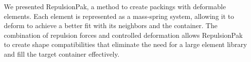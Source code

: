 
We presented RepulsionPak, a method to create packings with deformable elements.
Each element is represented as a
mass-spring system, allowing it to deform to achieve a better fit with
its neighbors and the container.
The combination of repulsion forces and controlled deformation
allows RepulsionPak to create shape compatibilities that
eliminate the need for a large element library
and fill the target container effectively.


